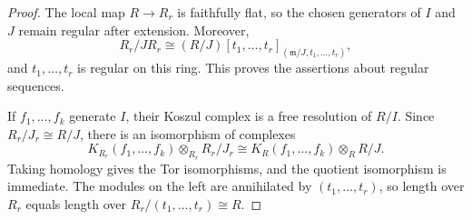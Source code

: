 \documentclass[11pt]{amsart}
\theoremstyle{remark}
\newcommand{\m}{\mathfrak m}
\begin{document}
\begin{proof}
The local map $R\to R_r$ is faithfully flat, so the chosen generators of $I$
and $J$ remain regular after extension. Moreover,
\[
 R_r/JR_r\cong
 (R/J)[t_1,\ldots,t_r]_{(\m/J,t_1,\ldots,t_r)},
\]
and $t_1,\ldots,t_r$ is regular on this ring. This proves the assertions about
regular sequences.

If $f_1,\ldots,f_k$ generate $I$, their Koszul complex is a free resolution of
$R/I$. Since $R_r/J_r\cong R/J$, there is an isomorphism of complexes
\[
 K_{R_r}(f_1,\ldots,f_k)\otimes_{R_r}R_r/J_r
 \cong K_R(f_1,\ldots,f_k)\otimes_R R/J.
\]
Taking homology gives the Tor isomorphisms, and the quotient isomorphism is
immediate. The modules on the left are annihilated by $(t_1,\ldots,t_r)$, so
length over $R_r$ equals length over
$R_r/(t_1,\ldots,t_r)\cong R$.
\end{proof}
\end{document}
